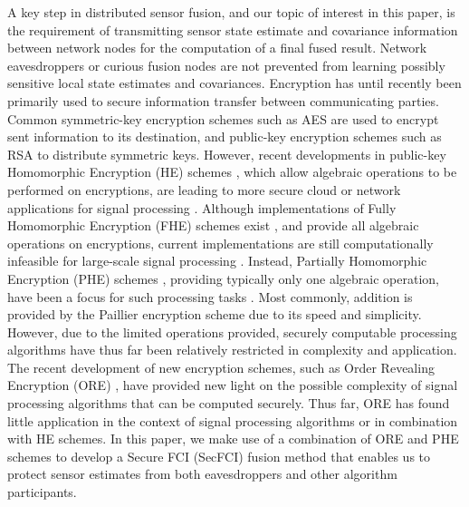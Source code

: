 \documentclass[letterpaper, 10 pt, conference]{ieeeconf}  %
\begin{document}
A key step in distributed sensor fusion, and our topic of interest in this paper, is the requirement of transmitting sensor state estimate and covariance information between network nodes for the computation of a final fused result. Network eavesdroppers or curious fusion nodes are not prevented from learning possibly sensitive local state estimates and covariances. Encryption has until recently been primarily used to secure information transfer between communicating parties. Common symmetric-key encryption schemes such as AES \cite{daemonAnnouncingAdvancedEncryption2001} are used to encrypt sent information to its destination, and public-key encryption schemes such as RSA \cite{rivestMethodObtainingDigital1978} to distribute symmetric keys. However, recent developments in public-key Homomorphic Encryption (HE) schemes \cite{gentryFullyHomomorphicEncryption2009,elgamalPublicKeyCryptosystem1985,paillierPublicKeyCryptosystemsBased1999}, which allow algebraic operations to be performed on encryptions, are leading to more secure cloud or network applications for signal processing \cite{lagendijkEncryptedSignalProcessing2013,alexandruEncryptedCooperativeControla,aristovEncryptedMultisensorInformation2018}. Although implementations of Fully Homomorphic Encryption (FHE) schemes exist \cite{gentryImplementingGentryFullyHomomorphic2011}, and provide all algebraic operations on encryptions, current implementations are still computationally infeasible for large-scale signal processing \cite{duImplementingMLAlgorithms2017,acarSurveyHomomorphicEncryption2018}. Instead, Partially Homomorphic Encryption (PHE) schemes \cite{elgamalPublicKeyCryptosystem1985,paillierPublicKeyCryptosystemsBased1999}, providing typically only one algebraic operation, have been a focus for such processing tasks \cite{alexandruEncryptedCooperativeControla,aristovEncryptedMultisensorInformation2018}. Most commonly, addition is provided by the Paillier encryption scheme \cite{paillierPublicKeyCryptosystemsBased1999} due to its speed and simplicity. However, due to the limited operations provided, securely computable processing algorithms have thus far been relatively restricted in complexity and application. The recent development of new encryption schemes, such as Order Revealing Encryption (ORE) \cite{chenettePracticalOrderRevealingEncryption2016,lewiOrderRevealingEncryptionNew2016,bogatovComparativeEvaluationOrderPreserving}, have provided new light on the possible complexity of signal processing algorithms that can be computed securely. Thus far, ORE has found little application in the context of signal processing algorithms or in combination with HE schemes. In this paper, we make use of a combination of ORE and PHE schemes to develop a Secure FCI (SecFCI) fusion method that enables us to protect sensor estimates from both eavesdroppers and other algorithm participants.
\end{document}
